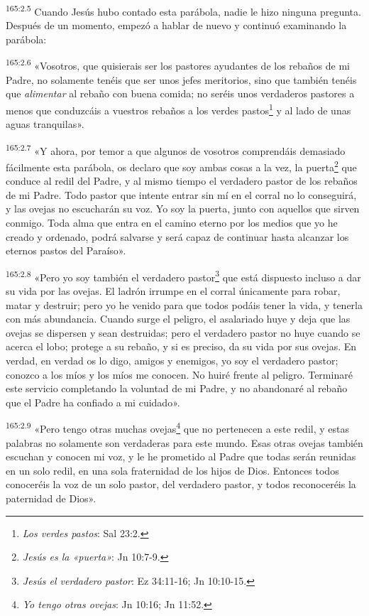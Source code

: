 \par
\textsuperscript{165:2.5} Cuando Jesús hubo contado esta parábola, nadie le hizo ninguna pregunta. Después de un momento, empezó a hablar de nuevo y continuó examinando la parábola:

\par
\textsuperscript{165:2.6} «Vosotros, que quisierais ser los pastores ayudantes de los rebaños de mi Padre, no solamente tenéis que ser unos jefes meritorios, sino que también tenéis que \textit{alimentar} al rebaño con buena comida; no seréis unos verdaderos pastores a menos que conduzcáis a vuestros rebaños a los verdes pastos\footnote{\textit{Los verdes pastos}: Sal 23:2.} y al lado de unas aguas tranquilas».

\par
\textsuperscript{165:2.7} «Y ahora, por temor a que algunos de vosotros comprendáis demasiado fácilmente esta parábola, os declaro que soy ambas cosas a la vez, la puerta\footnote{\textit{Jesús es la «puerta»}: Jn 10:7-9.} que conduce al redil del Padre, y al mismo tiempo el verdadero pastor de los rebaños de mi Padre. Todo pastor que intente entrar sin mí en el corral no lo conseguirá, y las ovejas no escucharán su voz. Yo soy la puerta, junto con aquellos que sirven conmigo. Toda alma que entra en el camino eterno por los medios que yo he creado y ordenado, podrá salvarse y será capaz de continuar hasta alcanzar los eternos pastos del Paraíso».

\par
\textsuperscript{165:2.8} «Pero yo soy también el verdadero pastor\footnote{\textit{Jesús el verdadero pastor}: Ez 34:11-16; Jn 10:10-15.} que está dispuesto incluso a dar su vida por las ovejas. El ladrón irrumpe en el corral únicamente para robar, matar y destruir; pero yo he venido para que todos podáis tener la vida, y tenerla con más abundancia. Cuando surge el peligro, el asalariado huye y deja que las ovejas se dispersen y sean destruidas; pero el verdadero pastor no huye cuando se acerca el lobo; protege a su rebaño, y si es preciso, da su vida por sus ovejas. En verdad, en verdad os lo digo, amigos y enemigos, yo soy el verdadero pastor; conozco a los míos y los míos me conocen. No huiré frente al peligro. Terminaré este servicio completando la voluntad de mi Padre, y no abandonaré al rebaño que el Padre ha confiado a mi cuidado».

\par
\textsuperscript{165:2.9} «Pero tengo otras muchas ovejas\footnote{\textit{Yo tengo otras ovejas}: Jn 10:16; Jn 11:52.} que no pertenecen a este redil, y estas palabras no solamente son verdaderas para este mundo. Esas otras ovejas también escuchan y conocen mi voz, y le he prometido al Padre que todas serán reunidas en un solo redil, en una sola fraternidad de los hijos de Dios. Entonces todos conoceréis la voz de un solo pastor, del verdadero pastor, y todos reconoceréis la paternidad de Dios».

